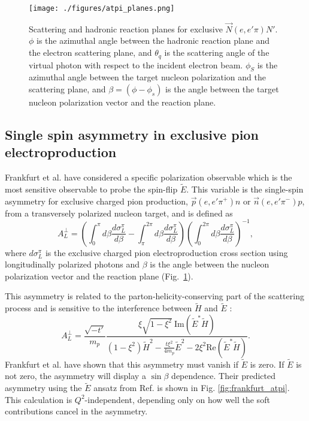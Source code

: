 \begin{figure}[hbt!]
\begin{center}
\texttt{[image: ./figures/atpi\_planes.png]}
\end{center}
\caption{\label{fig:planes}
\footnotesize{
Scattering and hadronic reaction planes for exclusive $\vec{N}(e,e'\pi)N'$.
$\phi$ is the azimuthal angle between the hadronic reaction plane and the
electron scattering plane, and $\theta_q$ is the scattering angle of the
virtual photon with respect to the incident electron beam.  $\phi_S$ is the
azimuthal angle between the target nucleon polarization and the scattering
plane, and $\beta=(\phi-\phi_s)$ is the angle between the target nucleon
polarization vector and the reaction plane.}}
\end{figure}

\subsection{Single spin asymmetry in exclusive pion electroproduction}

Frankfurt et al. \cite{Fr99} have considered a specific polarization observable
which is the most sensitive observable to probe the spin-flip $\tilde{E}$.
This variable is the single-spin asymmetry for exclusive charged pion
production, $\vec{p}(e,e'\pi^+)n$ or $\vec{n}(e,e'\pi^-)p$, from a transversely
polarized nucleon target, and is defined \cite{Be01} as
\begin{equation} \label{eqn:asy}
A_L^{\perp}=(\int^{\pi}_0 d\beta \frac{d\sigma^{\pi}_L}{d\beta} -
\int^{2\pi}_{\pi} d\beta \frac{d\sigma^{\pi}_L}{d\beta})
(\int^{2\pi}_0 d\beta \frac{d\sigma^{\pi}_L}{d\beta})^{-1},
\end{equation}
where $d\sigma^{\pi}_L$ is the exclusive charged pion electroproduction cross
section using longitudinally polarized photons and $\beta$ is the angle between
the nucleon polarization vector and the reaction plane
(Fig.~\ref{fig:planes}). 

This asymmetry is related to the parton-helicity-conserving part of the
scattering process and is sensitive to the interference between $\tilde{H}$ and
$\tilde{E}$ \cite{Fr99,Di05}:
\begin{equation} \label{eqn:asy2}
A_L^{\perp}=\frac{\sqrt{-t'}}{m_p}
\frac{\xi\sqrt{1-\xi^2}\ \mathrm{Im}(\tilde{E}^*\tilde{H})}
{(1-\xi^2)\tilde{H}^2-\frac{t\xi^2}{4m_p}
\tilde{E}^2-2\xi^2\mathrm{Re}(\tilde{E}^*\tilde{H})}.
\end{equation}
Frankfurt et al. \cite{Fr99} have shown that this asymmetry must vanish if
$\tilde{E}$ is zero.  If $\tilde{E}$ is not zero, the asymmetry will display a
$\sin\beta$ dependence.  Their predicted asymmetry using the
$\tilde{E}$ ansatz from Ref. \cite{Va99} is shown in
Fig. \ref{fig:frankfurt_atpi}.  This calculation is $Q^2$-independent,
depending only on how well the soft contributions cancel in the asymmetry.


